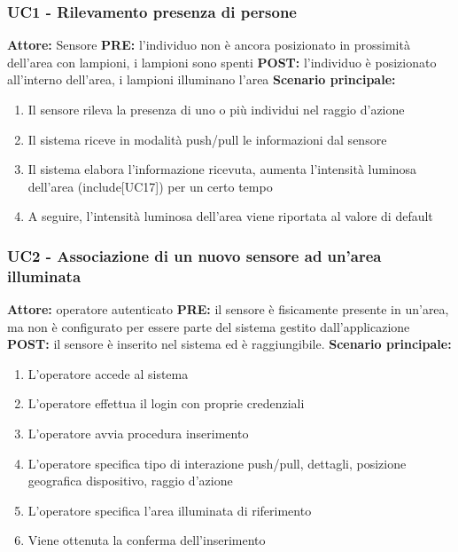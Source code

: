 \documentclass[a4paper, 12pt]{article}
\begin{document}
\subsubsection{UC1 - Rilevamento presenza di persone}
\textbf{Attore:} Sensore\newline
\textbf{PRE:} l'individuo non è ancora posizionato in prossimità dell'area con lampioni, i lampioni sono spenti\newline
\textbf{POST:} l'individuo è posizionato all'interno dell'area, i lampioni illuminano l'area\newline
\textbf{Scenario principale:}
\begin{enumerate}
    \item Il sensore rileva la presenza di uno o più individui nel raggio d'azione
    \item Il sistema riceve in modalità push/pull le informazioni dal sensore
    \item Il sistema elabora l'informazione ricevuta, aumenta l'intensità luminosa dell'area (include[UC17]) per un certo tempo
    \item A seguire, l'intensità luminosa dell'area viene riportata al valore di default
\end{enumerate}

\subsubsection{UC2 - Associazione di un nuovo sensore ad un'area illuminata}
\textbf{Attore:} operatore autenticato\newline
\textbf{PRE:} il sensore è fisicamente presente in un'area, ma non è configurato per essere parte del sistema gestito dall'applicazione\newline
\textbf{POST:} il sensore è inserito nel sistema ed è raggiungibile.\newline
\textbf{Scenario principale:}
\begin{enumerate}
    \item L'operatore accede al sistema
    \item L'operatore effettua il login con proprie credenziali
    \item L'operatore avvia procedura inserimento
    \item L'operatore specifica tipo di interazione push/pull, dettagli, posizione geografica dispositivo, raggio d'azione
    \item L'operatore specifica l'area illuminata di riferimento
    \item Viene ottenuta la conferma dell'inserimento
\end{enumerate}
\end{document}

